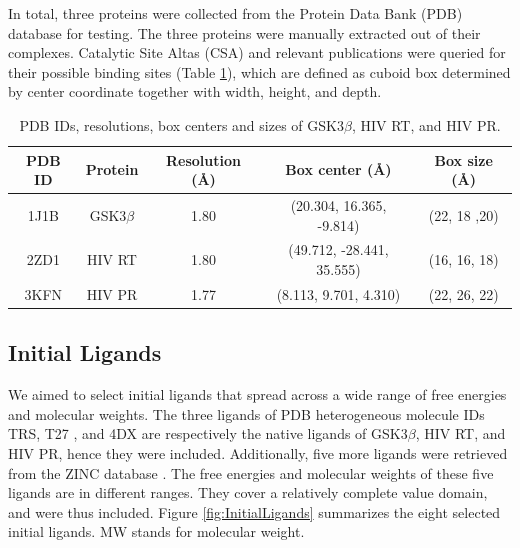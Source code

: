 In total, three proteins were collected from the Protein Data Bank (PDB) database \citep{540-2000,539-2000,537-2003,105-2007,538-2008} for testing. The three proteins were manually extracted out of their complexes. Catalytic Site Altas (CSA) \citep{209-2004} and relevant publications \citep{245-2004,247-2004,248-2006,704-2010,300-2010,322-2010,318-2010,321-2008,504-2010} were queried for their possible binding sites (Table \ref{tab:SynthesisSearchSpace}), which are defined as cuboid box determined by center coordinate together with width, height, and depth.

\begin{table}
\centering
\begin{tabular*}
{\textwidth}
{@{\extracolsep{\fill}}ccccc}
\toprule
PDB ID & Protein & Resolution (\AA) & Box center (\AA) & Box size (\AA)\\
\midrule
1J1B & GSK3$\beta$ & 1.80 & (20.304, 16.365, -9.814)  & (22, 18 ,20)\\
2ZD1 & HIV RT      & 1.80 & (49.712, -28.441, 35.555) & (16, 16, 18)\\
3KFN & HIV PR      & 1.77 & (8.113, 9.701, 4.310)     & (22, 26, 22)\\
\bottomrule
\end{tabular*}
\caption{PDB IDs, resolutions, box centers and sizes of GSK3$\beta$, HIV RT, and HIV PR.}
\label{tab:SynthesisSearchSpace}
\end{table}

\subsection{Initial Ligands}

We aimed to select initial ligands that spread across a wide range of free energies and molecular weights. The three ligands of PDB heterogeneous molecule IDs TRS, T27 \citep{299-2005,321-2008}, and 4DX are respectively the native ligands of GSK3$\beta$, HIV RT, and HIV PR, hence they were included. Additionally, five more ligands were retrieved from the ZINC database \citep{532-2005}. The free energies and molecular weights of these five ligands are in different ranges. They cover a relatively complete value domain, and were thus included. Figure \ref{fig:InitialLigands} summarizes the eight selected initial ligands. MW stands for molecular weight.

